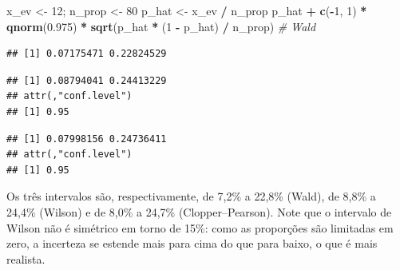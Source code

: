 \documentclass[
]{book}
\newenvironment{Shaded}{\begin{snugshade}}{\end{snugshade}}
\newcommand{\AttributeTok}[1]{\textcolor[rgb]{0.13,0.29,0.53}{#1}}
\newcommand{\CommentTok}[1]{\textcolor[rgb]{0.56,0.35,0.01}{\textit{#1}}}
\newcommand{\ConstantTok}[1]{\textcolor[rgb]{0.56,0.35,0.01}{#1}}
\newcommand{\DecValTok}[1]{\textcolor[rgb]{0.00,0.00,0.81}{#1}}
\newcommand{\FloatTok}[1]{\textcolor[rgb]{0.00,0.00,0.81}{#1}}
\newcommand{\FunctionTok}[1]{\textcolor[rgb]{0.13,0.29,0.53}{\textbf{#1}}}
\newcommand{\NormalTok}[1]{#1}
\newcommand{\OtherTok}[1]{\textcolor[rgb]{0.56,0.35,0.01}{#1}}
\newcommand{\SpecialCharTok}[1]{\textcolor[rgb]{0.81,0.36,0.00}{\textbf{#1}}}
\begin{document}
\begin{Shaded}
\begin{Highlighting}[]
\NormalTok{x\_ev }\OtherTok{\textless{}{-}} \DecValTok{12}\NormalTok{; n\_prop }\OtherTok{\textless{}{-}} \DecValTok{80}
\NormalTok{p\_hat }\OtherTok{\textless{}{-}}\NormalTok{ x\_ev }\SpecialCharTok{/}\NormalTok{ n\_prop}
\NormalTok{p\_hat }\SpecialCharTok{+} \FunctionTok{c}\NormalTok{(}\SpecialCharTok{{-}}\DecValTok{1}\NormalTok{, }\DecValTok{1}\NormalTok{) }\SpecialCharTok{*} \FunctionTok{qnorm}\NormalTok{(}\FloatTok{0.975}\NormalTok{) }\SpecialCharTok{*} \FunctionTok{sqrt}\NormalTok{(p\_hat }\SpecialCharTok{*}\NormalTok{ (}\DecValTok{1} \SpecialCharTok{{-}}\NormalTok{ p\_hat) }\SpecialCharTok{/}\NormalTok{ n\_prop)  }\CommentTok{\# Wald}
\end{Highlighting}
\end{Shaded}

\begin{verbatim}
## [1] 0.07175471 0.22824529
\end{verbatim}

\begin{Shaded}
\end{Shaded}

\begin{verbatim}
## [1] 0.08794041 0.24413229
## attr(,"conf.level")
## [1] 0.95
\end{verbatim}

\begin{Shaded}
\end{Shaded}

\begin{verbatim}
## [1] 0.07998156 0.24736411
## attr(,"conf.level")
## [1] 0.95
\end{verbatim}

Os três intervalos são, respectivamente, de 7,2\% a 22,8\% (Wald), de 8,8\% a 24,4\% (Wilson) e de 8,0\% a 24,7\% (Clopper--Pearson). Note que o intervalo de Wilson não é simétrico em torno de 15\%: como as proporções são limitadas em zero, a incerteza se estende mais para cima do que para baixo, o que é mais realista.
\end{document}
